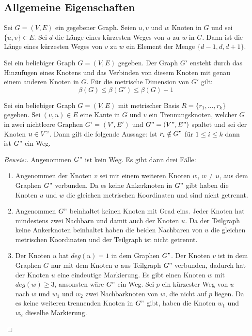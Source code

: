 \subsection{Allgemeine Eigenschaften}
\begin{lem}\cite{landmarks}
\label{dist}
Sei $G=(V,E)$ ein gegebener Graph. Seien $u,v$ und $w$ Knoten in $G$ und sei $\{u,v\}\in E$. Sei $d$ die Länge eines kürzesten Weges von $u$ zu $w$ in $G$. Dann ist die Länge eines kürzesten Weges von $v$ zu $w$ ein Element der Menge $\{d-1,d,d+1\}$.
\end{lem}
\begin{lem}
\cite{bases}
\label{einelementreichtnicht}
Sei ein beliebiger Graph $G=(V,E)$ gegeben. Der Graph $G'$ ensteht durch das Hinzufügen eines Knotens und das Verbinden von diesem Knoten mit genau einem anderen Knoten in $G$. Für die metrische Dimension von $G'$ gilt:
$$\beta(G)\leq \beta(G')\leq \beta(G)+1$$ 
\end{lem}
\begin{lem}
\label{wegtrennungsknoten}
\label{first_theorem}
Sei ein beliebiger Graph $G=(V,E)$ mit metrischer Basis $R=\{r_1, \ldots, r_k\}$ gegeben. Sei $(v,u) \in E$ eine Kante in $G$ und $v$ ein Trennungsknoten, welcher $G$ in zwei nichtleere Graphen $G'=(V',E')$ und $G"=(V",E")$ spaltet und sei der Knoten $u \in V"$. Dann gilt die folgende Aussage:\newline
Ist $r_i \notin G"$ für $1 \leq i \leq k$ dann ist $G"$ ein Weg.
\end{lem}
\begin{proof}[Beweis:]
Angenommen $G"$ ist kein Weg. Es gibt dann drei Fälle:
\begin{enumerate}
\item Angenommen der Knoten $v$ sei mit einem weiteren Knoten $w$, $w \neq u$, aus dem Graphen $G"$ verbunden. Da es keine Ankerknoten in $G"$ gibt haben die Knoten $u$ und $w$ die gleichen metrischen Koordinaten und sind nicht getrennt.
\item Angenommen $G"$ beinhaltet keinen Knoten mit Grad eins. Jeder Knoten hat mindestens zwei Nachbarn und damit auch der Knoten $u$. Da der Teilgraph keine Ankerknoten beinhaltet haben die beiden Nachbaren von $u$ die gleichen metrischen Koordinaten und der Teilgraph ist nicht getrennt.
\item Der Knoten $u$ hat $deg(u)=1$ in dem Graphen $G"$. Der Knoten $v$ ist in dem Graphen $G$ nur mit dem Knoten $u$ aus Teilgraph $G"$ verbunden, dadurch hat der Knoten $u$ eine eindeutige Markierung. Es gibt einen Knoten $w$ mit $deg(w) \geq 3$, ansonsten wäre $G"$ ein Weg. Sei $p$ ein kürzester Weg von $u$ nach $w$ und $w_1$ und $w_2$ zwei Nachbarknoten von $w$, die nicht auf $p$ liegen. Da es keine weiteren trennenden Knoten in $G"$ gibt, haben die Knoten $w_1$ und $w_2$ dieselbe Markierung.   
\end{enumerate}
\vspace{-4mm}
\end{proof}
